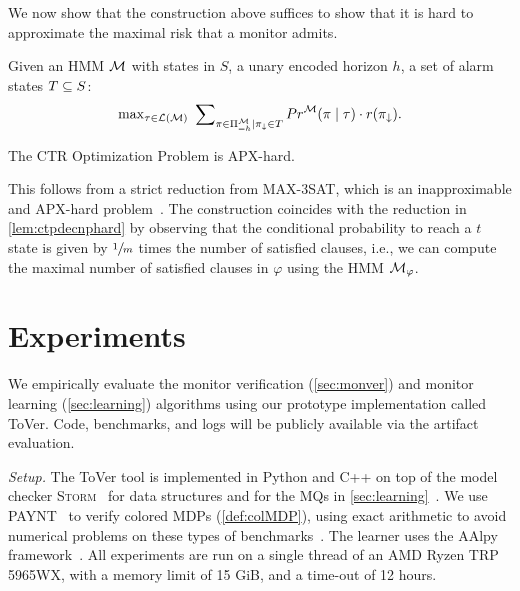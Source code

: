 \documentclass[runningheads]{llncs}
\newcommand{\sj}[2][]{\todo[color=red!50!white,#1]{\footnotesize{SJ: #2}}}
\renewcommand{\paragraph}[1]{\smallskip\noindent\emph{#1}}
\newcommand{\alg}{ToVer\xspace}
\begin{document}
We now show that the construction above suffices to show that it is hard to approximate the maximal risk that a monitor admits.
\begin{definition}
    Given an HMM $\mathcal{M}$ with states in $S$, a unary encoded horizon $h$, a set of alarm states $T\subseteq S$: \[\max\nolimits_{\tau \in \mathcal{L}(\mathcal{M})}~ \sum\nolimits_{\pi\in\Pi^{\mathcal{M}}_{=h}\mid\pi_\downarrow \in T}{Pr}^{\mathcal{M}}(\pi \mid \tau) \cdot r(\pi_\downarrow).\]\end{definition}
\begin{lemma}
    \label{lem:ctpapxhard}
    The CTR Optimization Problem is APX-hard.
\end{lemma}
This follows from a strict reduction from MAX-3SAT, which is an inapproximable and APX-hard problem~\cite{DBLP:journals/jacm/Hastad01}. The construction coincides with the reduction in \cref{lem:ctpdecnphard} by observing that the conditional probability to reach a $t$ state is given by $\sfrac{1}{m}$ times the number of satisfied clauses, i.e., we can compute the maximal number of satisfied clauses in $\varphi$ using the HMM $\mathcal{M}_\varphi$.



\section{Experiments}\label{sec:experiments}
\noindent We empirically evaluate the monitor verification (\cref{sec:monver}) and monitor learning (\cref{sec:learning}) algorithms using our prototype implementation called \alg.
Code, benchmarks, and logs will be publicly available via the artifact evaluation.


\paragraph{Setup.}
The \alg tool is implemented in Python and C++ on top of the model checker \textsc{Storm}~\cite{henselProbabilisticModelChecker2022} for data structures and for the MQs in \cref{sec:learning}~\cite{jungesRuntimeMonitorsMarkov2021}.
We use PAYNT~\cite{andriushchenkoPAYNTToolInductive2021} to verify colored MDPs (\cref{def:colMDP}), using exact arithmetic to avoid numerical problems on these types of benchmarks~\cite{DBLP:conf/tacas/HartmannsJQW23}.
The learner uses the AAlpy framework~\cite{muskardinAALpyActiveAutomata2022}.
All experiments are run  on a single thread of an AMD Ryzen TRP 5965WX, with a memory limit of 15 GiB, and a time-out of 12 hours.
\end{document}
